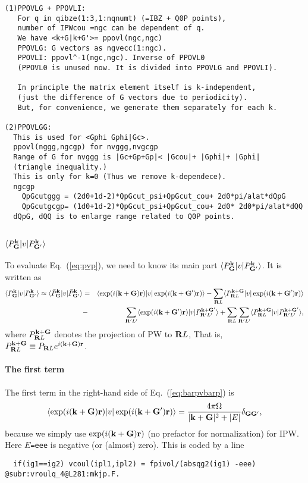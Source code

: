 \documentclass[a4paper,10pt,fleqn]{article}
\newcommand{\bfk}{{\bf k}}
\newcommand{\bfr}{{\bf r}}
\newcommand{\bfG}{{\bf G}}
\newcommand{\bfR}{{\bf R}}
\newcommand{\req}[1]{\mbox{Eq.~(\ref{#1})}}
\begin{document}
\begin{verbatim}
(1)PPOVLG + PPOVLI:
   For q in qibze(1:3,1:nqnumt) (=IBZ + Q0P points), 
   number of IPWcou =ngc can be dependent of q.
   We have <k+G|k+G'>= ppovl(ngc,ngc) 
   PPOVLG: G vectors as ngvecc(1:ngc).
   PPOVLI: ppovl^-1(ngc,ngc). Inverse of PPOVL0
   (PPOVL0 is unused now. It is divided into PPOVLG and PPOVLI).

   In principle the matrix element itself is k-independent,
   (just the difference of G vectors due to periodicity).
   But, for convenience, we generate them separately for each k.

(2)PPOVLGG: 
  This is used for <Gphi Gphi|Gc>.
  ppovl(nggg,ngcgp) for nvggg,nvgcgp
  Range of G for nvggg is |Gc+Gp+Gp|< |Gcou|+ |Gphi|+ |Gphi| 
  (triangle inequality.)
  This is only for k=0 (Thus we remove k-dependece).
  ngcgp 
    QpGcutggg = (2d0+1d-2)*QpGcut_psi+QpGcut_cou+ 2d0*pi/alat*dQpG 
    QpGcutgcgp= (1d0+1d-2)*QpGcut_psi+QpGcut_cou+ 2d0* 2d0*pi/alat*dQQ
  dQpG, dQQ is to enlarge range related to Q0P points.

\end{verbatim}


\subsection{$\langle {P}^\bfk_\bfG |v| {P}^\bfk_{\bfG'} \rangle$}
To evaluate \req{eq:pvp}, we need to know 
its main part $\langle {P}^\bfk_\bfG |v| {P}^\bfk_{\bfG'} \rangle$. It is written as
\begin{eqnarray}
\langle {P}^\bfk_\bfG |v| {P}^\bfk_{\bfG'} \rangle
\approx
\langle \bar{P}^\bfk_\bfG |v| \bar{P}^\bfk_{\bfG'} \rangle
&=&\langle \exp(i(\bfk+\bfG)\bfr) |v| \exp(i(\bfk+\bfG')\bfr) \rangle
-\sum_{\bfR{L}} 
\langle P^{\bfk+\bfG}_{\bfR{L}}|v| \exp(i(\bfk+\bfG')\bfr) \rangle \nonumber \\
&-&\sum_{\bfR'{L'}} 
\langle \exp(i(\bfk+\bfG')\bfr) |v| P^{\bfk+\bfG'}_{\bfR'{L'}}\rangle
+\sum_{\bfR{L}} \sum_{\bfR'{L'}} 
\langle P^{\bfk+\bfG}_{\bfR{L}}|v|P^{\bfk+\bfG'}_{\bfR'{L'}} \rangle,
\label{eq:barpvbarp}
\end{eqnarray}
where $P^{\bfk+\bfG}_{\bfR{L}}$ denotes 
the projection of PW to ${\bfR{L}}$,
That is, 
$P^{\bfk+\bfG}_{\bfR{L}} \equiv 
{P}_{\bfR{L}} e^{i ({\bf k+ G}){\bf r}}$.

\paragraph{The first term}  
The first term in the right-hand side of \req{eq:barpvbarp} is
\begin{eqnarray}
\langle \exp(i(\bfk+\bfG)\bfr) |v| \exp(i(\bfk+\bfG')\bfr) \rangle
=\frac{4 \pi \Omega}{|\bfk+\bfG|^2+|E|} \delta_{\bfG\bfG'},
\label{eq:barpvbarp1st}
\end{eqnarray}
because we simply use $\exp(i(\bfk+\bfG)\bfr)$ 
(no prefactor for normalization) for IPW. 
Here $E$\verb!=eee! is negative (or (almost) zero). 
This is coded by a line 
\begin{verbatim}
  if(ig1==ig2) vcoul(ipl1,ipl2) = fpivol/(absqg2(ig1) -eee)
@subr:vroulq_4@L281:mkjp.F.
\end{verbatim}
\end{document}
